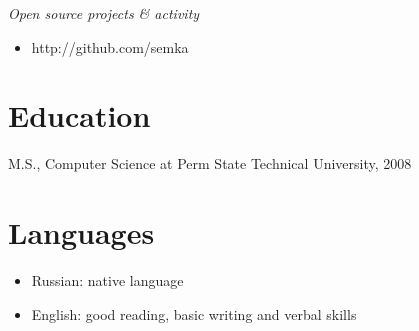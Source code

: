 \documentclass[12pt]{res}
\begin{document}
\begin{resume}
{\sl Open source projects \& activity}
\begin{itemize}
\item http://github.com/semka
\end{itemize}

\section{Education}
M.S., Computer Science at Perm State Technical University, 2008

\section{Languages}
\begin{itemize}
\item Russian: native language
\item English: good reading, basic writing and verbal skills
\end{itemize}

\end{resume}
\end{document}
